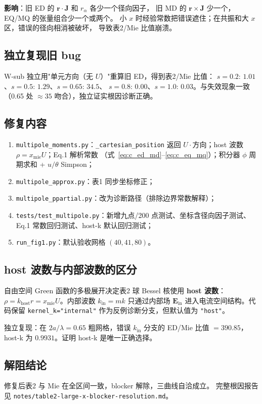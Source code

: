 \textbf{影响}：旧 ED 的 $\mathbf{r}\cdot\mathbf{J}$ 和 $r_\alpha$ 各少一个径向因子，
旧 MD 的 $\mathbf{r}\times\mathbf{J}$ 少一个，EQ/MQ 的张量组合少一个或两个。
小 $x$ 时经验常数把错误遮住；在共振和大 $x$ 区，错误的径向相消被破坏，
导致表2/Mie 比值崩溃。

\subsection{独立复现旧 bug}

W-sub 独立用"单元方向（无 $U$）"重算旧 ED，得到表2/Mie 比值：
$s=0.2{:}\,1.01$、$s=0.5{:}\,1.29$、$s=0.65{:}\,34.5$、
$s=0.8{:}\,0.00$、$s=1.0{:}\,0.03$。与失效现象一致
（0.65 处 $\approx35$ 吻合），独立证实根因诊断正确。

\subsection{修复内容}

\begin{enumerate}
  \item \texttt{multipole\_moments.py}：\texttt{\_cartesian\_position} 返回
        $U\cdot$方向；host 波数 $\rho=x_{\mathrm{mie}}U$；Eq.1 解析常数
        （式~\eqref{eq:c_ed_md}--\eqref{eq:c_eq_mq}）；积分器 $\phi$ 周期求和
        + $u/\theta$ Simpson；
  \item \texttt{multipole\_approx.py}：表1 同步坐标修正；
  \item \texttt{multipole\_ppartial.py}：改为诊断路径（排除边界常数解释）；
  \item \texttt{tests/test\_multipole.py}：新增九点/200 点测试、坐标含径向因子测试、
        Eq.1 常数回归测试、host-k 默认回归测试；
  \item \texttt{run\_fig1.py}：默认验收网格 $(40,41,80)$。
\end{enumerate}

\subsection{host 波数与内部波数的区分}

自由空间 Green 函数的多极展开决定表2 球 Bessel 核使用 \textbf{host 波数}：
$\rho=k_{\mathrm{host}}r=x_{\mathrm{mie}}U$。内部波数 $k_{\mathrm{in}}=mk$
只通过内部场 $\mathbf{E}_{\mathrm{in}}$ 进入电流空间结构。代码保留
\texttt{kernel\_k="internal"} 作为反例诊断分支，但默认值为 \texttt{"host"}。

独立复现：在 $2a/\lambda=0.65$ 粗网格，错误 $k_{\mathrm{in}}$ 分支的 ED/Mie
比值 $=390.85$，host-k 为 $0.9931$。证明 host-k 是唯一正确选择。

\subsection{解阻结论}

修复后表2 与 Mie 在全区间一致，blocker 解除，三曲线自洽成立。
完整根因报告见 \texttt{notes/table2-large-x-blocker-resolution.md}。
